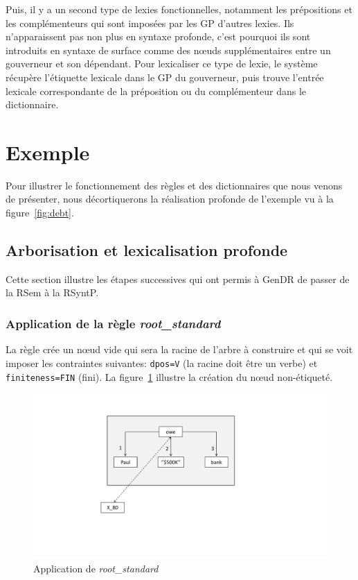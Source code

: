 Puis, il y a un second type de lexies fonctionnelles, notamment les prépositions et les complémenteurs qui sont imposées par les \ac{GP} d'autres lexies. Ils n'apparaissent pas non plus en syntaxe profonde, c'est pourquoi ils sont introduits en syntaxe de surface comme des n\oe{}uds supplémentaires entre un gouverneur et son dépendant. Pour lexicaliser ce type de lexie, le système récupère l'étiquette lexicale dans le \ac{GP} du gouverneur, puis trouve l'entrée lexicale correspondante de la préposition ou du complémenteur dans le dictionnaire.


\section{Exemple}\label{sec:exemple}

Pour illustrer le fonctionnement des règles et des dictionnaires que nous venons de présenter, nous décortiquerons la réalisation profonde de l'exemple vu à la figure~\ref{fig:debt}.

\subsection{Arborisation et lexicalisation profonde}

Cette section illustre les étapes successives qui ont permis à GenDR de passer de la \ac{RSem} à la \ac{RSyntP}.

\subsubsection{Application de la règle \emph{root\_standard}}
La règle crée un n\oe{}ud vide qui sera la racine de l'arbre à construire et qui se voit imposer les contraintes suivantes: \texttt{dpos=V} (la racine doit être un verbe) et \texttt{finiteness=FIN} (fini). La figure~\ref{fig:rootstand} illustre la création du n\oe{}ud non-étiqueté.
\begin{figure}[htb]
	\centering
	\includegraphics[width=1\textwidth, trim = {0cm 5.3cm 0cm 2.6cm},clip]{ch3/figs/root_standard.pdf}
	\vspace{-0.5cm}
	\caption{Application de \emph{root\_standard}}
	\label{fig:rootstand}
\end{figure}

